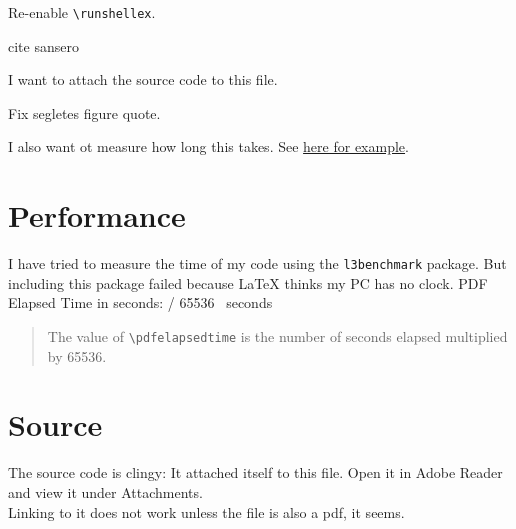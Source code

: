 \documentclass{article} \usepackage[utf8]{inputenc}
\newcommand{\code}[1]{\colorbox{codebggray}{{\texttt{#1}}}}
\begin{document}
Re-enable \code{\textbackslash runshellex}.

cite sansero

I want to attach the source code to this file.

Fix segletes figure quote.

I also want ot measure how long this takes. See \href{https://tex.stackexchange.com/questions/505770/how-to-measure-the-compilation-time-of-a-document?rq=1}{here for example}.
\section{Performance}
I have tried to measure the time of my code using the \code{l3benchmark} package. But including this package failed because LaTeX thinks my PC has no clock.
PDF Elapsed Time in seconds: \the\numexpr \pdfelapsedtime / 65536 \relax ~seconds
\begin{myquote}\begin{quote}
The value of \code{\textbackslash pdfelapsedtime} is the number of seconds elapsed multiplied by 65536. 
\end{quote}\end{myquote}

\section{Source}
The source code is clingy: It attached itself to this file. Open it in Adobe Reader and view it under Attachments.\\
Linking to it does not work unless the file is also a pdf, it seems.
\end{document}
